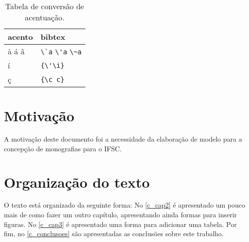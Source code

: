 \begin{table}[htbp]
\caption{Tabela de conversão de acentuação.}
\label{tabela-acentos}

\begin{center}
\begin{tabular}{ll}\toprule
acento & \textsf{bibtex}\\\midrule
à á ã & \verb+\`a+ \verb+\'a+ \verb+\~a+\\
í & \verb+{\'\i}+\\
ç & \verb+{\c c}+\\
\bottomrule
\end{tabular}
\end{center}
\end{table}




\section{Motivação}
\label{ci_s_motivacao}

A motivação deste documento foi a necessidade da elaboração de modelo para a concepção de monografias para o IFSC. 

\section{Organização do texto}
\label{ci_s_organizacao}

O texto está organizado da seguinte forma: No \autoref{c_cap2} é apresentado um pouco mais de como fazer um outro capítulo, apresentando ainda formas para inserir figuras. No \autoref{c_cap3} é apresentado uma forma para adicionar uma tabela. Por fim, no \autoref{c_conclusoes} são apresentadas as conclusões sobre este trabalho.